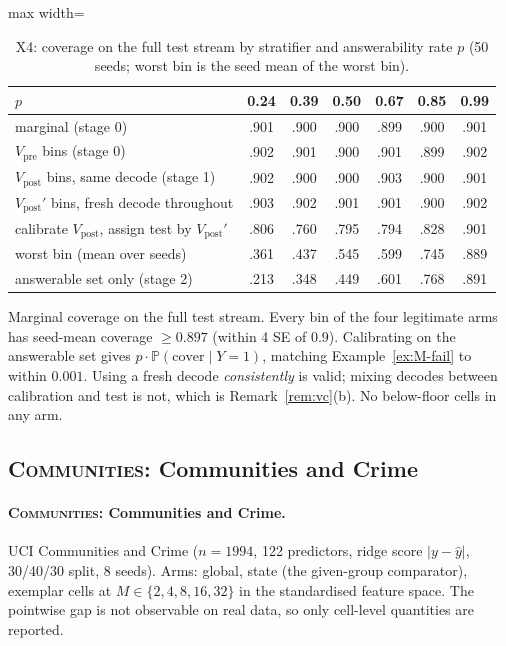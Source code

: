 \documentclass[twoside]{article}
\theoremstyle{definition}
\theoremstyle{remark}
\renewcommand{\P}{\mathbb{P}}
\newcommand{\1}{\mathbf{1}}
\newcommand{\expname}[1]{\textsc{#1}}
\begin{document}
\begin{table}[t]
\caption{X4: coverage on the full test stream by stratifier and answerability rate $p$ (50 seeds; worst bin is the seed mean of the worst bin).}
\centering\small
\begin{adjustbox}{max width=\textwidth}
\begin{tabular}{lcccccc}
\toprule
$p$ & 0.24 & 0.39 & 0.50 & 0.67 & 0.85 & 0.99\\
\midrule
marginal (stage 0)              & .901 & .900 & .900 & .899 & .900 & .901\\
$V_{\mathrm{pre}}$ bins (stage 0)  & .902 & .901 & .900 & .901 & .899 & .902\\
$V_{\mathrm{post}}$ bins, same decode (stage 1) & .902 & .900 & .900 & .903 & .900 & .901\\
$V_{\mathrm{post}}'$ bins, fresh decode throughout & .903 & .902 & .901 & .901 & .900 & .902\\
calibrate $V_{\mathrm{post}}$, assign test by $V_{\mathrm{post}}'$ & .806 & .760 & .795 & .794 & .828 & .901\\
\quad worst bin (mean over seeds) & .361 & .437 & .545 & .599 & .745 & .889\\
answerable set only (stage 2)   & .213 & .348 & .449 & .601 & .768 & .891\\
\bottomrule
\end{tabular}
\end{adjustbox}
\end{table}
Marginal coverage on the full test stream. Every bin of the four legitimate arms has
seed-mean coverage $\ge 0.897$ (within 4 SE of $0.9$). Calibrating on the answerable set gives
$p\cdot\P(\text{cover}\mid Y{=}1)$, matching Example~\ref{ex:M-fail} to within $0.001$.
Using a fresh decode \emph{consistently} is valid; mixing decodes between calibration and test
is not, which is Remark~\ref{rem:vc}(b). No below-floor cells in any arm.

\subsection{\expname{Communities}: Communities and Crime}
\paragraph{\expname{Communities}: Communities and Crime.}
UCI Communities and Crime \citep{redmond2002communities} ($n=1994$, 122 predictors, ridge score $|y-\hat y|$, 30/40/30
split, 8 seeds). Arms: global, state (the given-group comparator), exemplar cells at
$M\in\{2,4,8,16,32\}$ in the standardised feature space. The pointwise gap is not observable
on real data, so only cell-level quantities are reported. 
\end{document}
